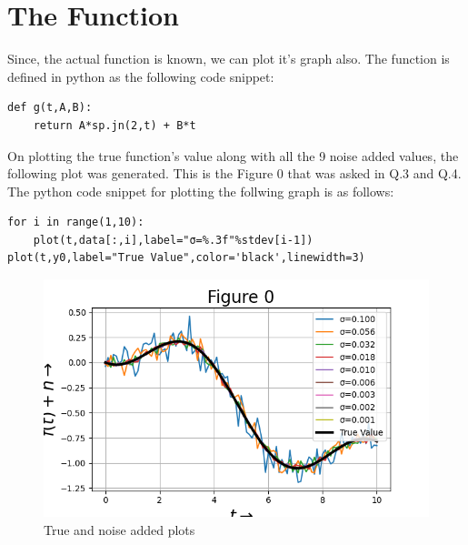 \documentclass[11pt, a4paper]{article}
\begin{document}
\section{The Function}
Since, the actual function is known, we can plot it's graph also. The function is defined in python as the following code snippet:
\begin{verbatim}	
def g(t,A,B):
    return A*sp.jn(2,t) + B*t
\end{verbatim}

On plotting the true function's value along with all the 9 noise added values, the following plot was generated. This is the Figure 0 that was asked in Q.3 and Q.4. The python code snippet for plotting the follwing graph is as follows:
\begin{verbatim}	
for i in range(1,10):
    plot(t,data[:,i],label="σ=%.3f"%stdev[i-1])
plot(t,y0,label="True Value",color='black',linewidth=3)	
\end{verbatim}

	\begin{figure}[!tbh]
   	\centering
   	\includegraphics[scale=0.6]{Figure_0.png}   
   	\caption{True and noise added plots}
   	\label{fig:sample}
   \end{figure} 
   
\end{document}
